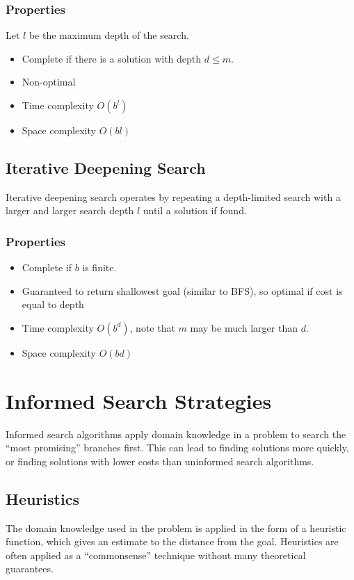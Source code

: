 \documentclass[12pt,titlepage]{article}
\let\stdsection\section
\renewcommand\section{\clearpage\stdsection}
\begin{document}
      \subsubsection{Properties}
        Let $l$ be the maximum depth of the search.
        \begin{itemize}
          \item Complete if there is a solution with depth $d \leq m$.
          \item Non-optimal
          \item Time complexity $O(b^l)$
          \item Space complexity $O(bl)$
        \end{itemize}

    \subsection{Iterative Deepening Search}
      Iterative deepening search operates by repeating a depth-limited search with a larger and larger
      search depth $l$ until a solution if found.

      \subsubsection{Properties}
        \begin{itemize}
          \item Complete if $b$ is finite.
          \item Guaranteed to return shallowest goal (similar to BFS), so optimal if cost is equal to depth
          \item Time complexity $O(b^d)$, note that $m$ may be much larger than $d$.
          \item Space complexity $O(bd)$
        \end{itemize}

  \section{Informed Search Strategies}
    Informed search algorithms apply domain knowledge in a problem to search the ``most promising'' branches first. This can lead to
    finding solutions more quickly, or finding solutions with lower costs than uninformed search algorithms.

    \subsection{Heuristics}
      The domain knowledge used in the problem is applied in the form of a heuristic function, which gives an estimate to the distance
      from the goal. Heuristics are often applied as a ``commonsense'' technique without many theoretical guarantees.
\end{document}
